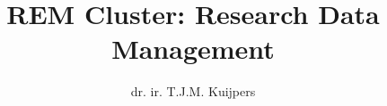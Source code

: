 \documentclass[a4paper,twoside,10pt]{book}
\begin{document}
 
%
\title{REM Cluster: Research Data Management}
\author{dr. ir. T.J.M. Kuijpers}
\maketitle

%







\end{document}
